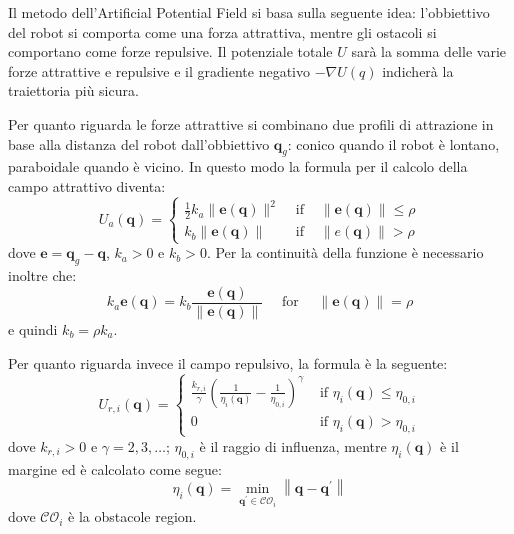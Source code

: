 \documentclass[Lau, binding=0.6cm, oneside]{sapthesis}
\begin{document}
Il metodo dell'Artificial Potential Field si basa sulla seguente idea: l'obbiettivo del robot si comporta come una forza attrattiva, mentre gli ostacoli si comportano come forze repulsive.
Il potenziale totale $U$ sarà la somma delle varie forze attrattive e repulsive e il gradiente negativo $-\nabla U(q)$ indicherà la traiettoria più sicura.

Per quanto riguarda le forze attrattive si combinano due profili di attrazione in base alla distanza del robot dall'obbiettivo $\boldsymbol{q}_{g}$: conico quando il robot è lontano, paraboidale quando è vicino.
In questo modo la formula per il calcolo della campo attrattivo diventa:
\newline
$$
U_{a}(\boldsymbol{q})=\left\{\begin{array}{cll}
\frac{1}{2} k_{a}\|\boldsymbol{e}(\boldsymbol{q})\|^{2} & \text { if } & \|\boldsymbol{e}(\boldsymbol{q})\| \leq \rho \\
k_{b}\|\boldsymbol{e}(\boldsymbol{q})\| & \text { if } & \|e(\boldsymbol{q})\|>\rho
\end{array}\right.
$$
\newline
dove $\boldsymbol{e}=\boldsymbol{q}_{g}-\boldsymbol{q}$, $k_{a}>0$ e $k_{b}>0$.
Per la continuità della funzione è necessario inoltre che:
$$
k_{a} \boldsymbol{e}(\boldsymbol{q})=k_{b} \frac{\boldsymbol{e}(\boldsymbol{q})}{\|\boldsymbol{e}(\boldsymbol{q})\|} \quad \text { for } \quad\|\boldsymbol{e}(\boldsymbol{q})\|=\rho
$$
\newline
e quindi $k_{b}=\rho k_{a}$.

Per quanto riguarda invece il campo repulsivo, la formula è la seguente:
\newline
$$
U_{r, i}(\boldsymbol{q})=\left\{\begin{array}{ll}
\frac{k_{r, i}}{\gamma}\left(\frac{1}{\eta_{i}(\boldsymbol{q})}-\frac{1}{\eta_{0, i}}\right)^{\gamma} & \text { if } \eta_{i}(\boldsymbol{q}) \leq \eta_{0, i} \\
0 & \text { if } \eta_{i}(\boldsymbol{q})>\eta_{0, i}
\end{array}\right.
$$
\newline
dove $k_{r, i}>0$ e $\gamma=2,3, \ldots$; $\eta_{0, i}$ è il raggio di influenza, mentre $\eta_{i}(\boldsymbol{q})$ è il margine ed è calcolato come segue:
$$
\eta_{i}(\boldsymbol{q})=\min _{\boldsymbol{q}^{\prime} \in \mathcal{C O}_{i}}\left\|\boldsymbol{q}-\boldsymbol{q}^{\prime}\right\|
$$
\newline
dove $\mathcal{C O}_{i}$ è la obstacole region.
\end{document}
